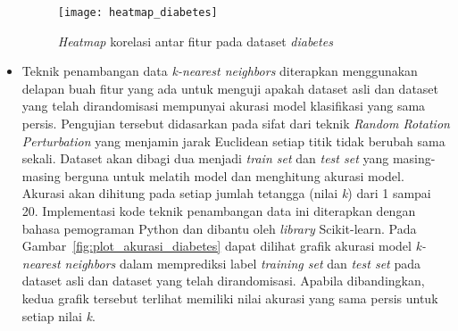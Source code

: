 \begin{itemize}
	\begin{figure}
		\centering
		\texttt{[image: heatmap\_diabetes]}
		\caption{\textit{Heatmap} korelasi antar fitur pada dataset \textit{diabetes}}
		\label{fig:heatmap_diabetes}
	\end{figure}
	\item Teknik penambangan data \textit{k-nearest neighbors} diterapkan menggunakan delapan buah fitur yang ada untuk menguji apakah dataset asli dan dataset yang telah dirandomisasi mempunyai akurasi model klasifikasi yang sama persis. Pengujian tersebut didasarkan pada sifat dari teknik \textit{Random Rotation Perturbation} yang menjamin jarak Euclidean setiap titik tidak berubah sama sekali. Dataset akan dibagi dua menjadi \textit{train set} dan \textit{test set} yang masing-masing berguna untuk melatih model dan menghitung akurasi model. Akurasi akan dihitung pada setiap jumlah tetangga (nilai \textit{k}) dari 1 sampai 20. Implementasi kode teknik penambangan data ini diterapkan dengan bahasa pemograman Python dan dibantu oleh \textit{library} Scikit-learn. Pada Gambar~\ref{fig:plot_akurasi_diabetes} dapat dilihat grafik akurasi model \textit{k-nearest neighbors} dalam memprediksi label \textit{training set} dan \textit{test set} pada dataset asli dan dataset yang telah dirandomisasi. Apabila dibandingkan, kedua grafik tersebut terlihat memiliki nilai akurasi yang sama persis untuk setiap nilai \textit{k}. 


\end{itemize}
